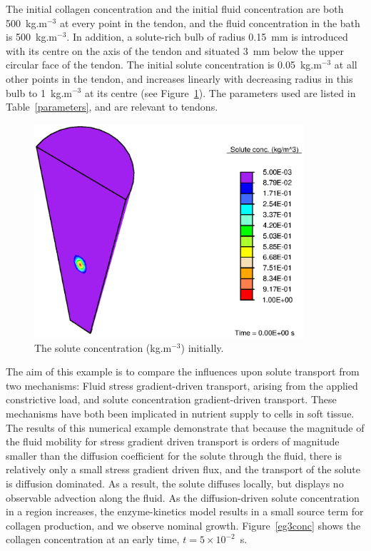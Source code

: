 The 
initial collagen concentration and the initial fluid concentration are
both 500~kg.m$^{-3}$ at every point in the tendon, and the fluid
concentration in the bath is 500~kg.m$^{-3}$. In
addition, a solute-rich bulb of radius 0.15~mm is introduced with
its centre on the axis of the tendon and situated 3~mm below the upper
circular face of the tendon. The initial solute concentration is
0.05~kg.m$^{-3}$ at all other points in the tendon, and increases
linearly with decreasing radius in this bulb to 1~kg.m$^{-3}$ at its
centre (see Figure~\ref{eg3ini}). The
parameters used are listed in Table~\ref{parameters}, and are relevant
to tendons.

\begin{figure}
\centering
\includegraphics[width=10.00cm]{images/initial-solute-concentration.eps}
\caption{The solute concentration (kg.m$^{-3}$) initially.}
\label{eg3ini}
\end{figure}

The aim of this example is to compare the influences upon solute
transport from two mechanisms: Fluid stress gradient-driven transport,
arising from the applied constrictive load, and solute concentration
gradient-driven transport. These mechanisms have both been implicated
in nutrient supply to cells in soft tissue. The results of this
numerical example demonstrate that because the magnitude of the fluid mobility
for stress gradient driven transport is orders of magnitude
smaller than the diffusion coefficient for the solute through the
fluid, there is relatively only a small stress gradient driven flux,
and the transport of the solute is diffusion dominated. As a result,
the solute diffuses locally, but displays no
observable advection along the fluid. As the diffusion-driven solute
concentration in a region increases, the enzyme-kinetics model
results in a small source term for collagen production, and we observe nominal
growth. Figure~\ref{eg3conc} shows the collagen concentration at an
early time, $t=5\times10^{-2}$~s.

